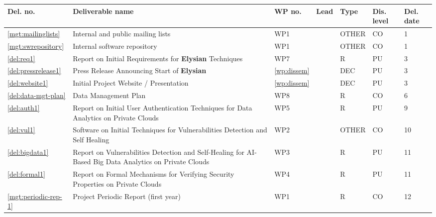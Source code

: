\documentclass[a4paper,11pt]{article}
\newcommand{\project}[1]{\textbf{#1}\xspace}
\newcommand{\SECURITY}{\project{Elysian}}
\newcommand{\TheProject}{\SECURITY}
\begin{document}
\newpage
{}
\label{sect:deliverables}

\begin{minipage}{\textwidth}
\begin{center}
\begin{tabular}{|p{0.8cm}|p{9.65cm}|p{0.8cm}|p{1.15cm}|p{1.2cm}|p{0.8cm}|p{0.8cm}|}  \hline
\textbf{Del. no.}              & \textbf{Deliverable name}        & \textbf{WP no.} & \textbf{Lead}
& \textbf{Type}              & \textbf{Dis. level}   & \textbf{Del. date}
\\ \hline
\ref{mgt:mailinglists}           & Internal and public mailing lists
                                                                  & WP1 &\coordshort{} & OTHER & CO &  1 \\
\hline \ref{mgt:swrepository} & Internal software repository & WP1 & \coordshort{} & OTHER & CO & 1 \\
\hline \ref{del:req1} & Report on Initial Requirements for \TheProject{} Techniques & WP7 & \SOPRAshort{} & R & PU & 3 \\
\hline \ref{del:pressrelease1} & Press Release Announcing Start of \TheProject{} & \ref{wp:dissem} & \SAshort{} & DEC & PU & 3 \\
\hline \ref{del:website1} & Initial Project Website / Presentation & \ref{wp:dissem} & \UODshort{} & DEC & PU & 3 \\
\hline \ref{del:data-mgt-plan} & Data Management Plan & WP8 & \coordshort{} & R & CO & 6 \\
\hline \ref{del:auth1} & Report on Initial User Authentication Techniques for Data Analytics on Private Clouds & WP5 & \COGNIshort{} & R & PU & 9 \\
\hline \ref{del:vul1} & Software on Initial Techniques for Vulnerabilities Detection and Self Healing & WP2 & \IBMshort{} & OTHER & CO & 10 \\
\hline \ref{del:bigdata1} & Report on Vulnerabilities Detection and Self-Healing for AI-Based Big Data Analytics on Private Clouds & WP3 & \UODshort{} & R & PU & 11 \\
\hline \ref{del:formal1} & Report on Formal Mechanisms for Verifying Security Properties on Private Clouds & WP4 & \SCCHshort{} & R & PU & 11 \\
\hline \ref{mgt:periodic-rep-1} & Project Periodic Report (first year) & WP1 & \coordshort{} & R & CO & 12 \\

\end{tabular}
\end{center}
\end{minipage}
\end{document}
